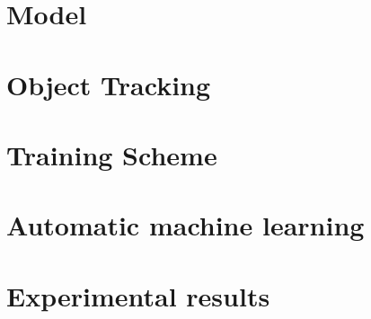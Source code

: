 \documentclass[fypca]{socreport}
\begin{document}

\chapter{Model}


\chapter{Object Tracking}


\chapter{Training Scheme}


\chapter{Automatic machine learning}


\chapter{Experimental results}


{}

\end{document}
